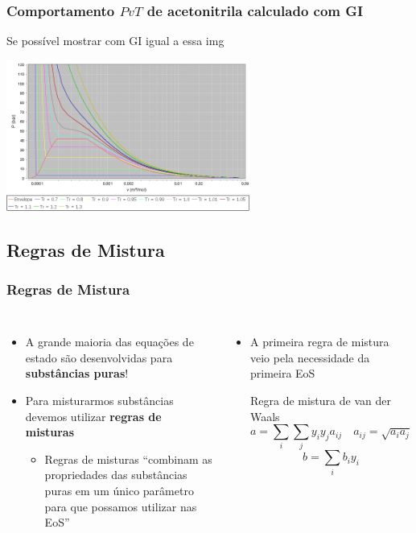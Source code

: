 \documentclass[aspectratio=169]{beamer}
\begin{document}
\begin{frame}
	\frametitle{Comportamento $PvT$ de acetonitrila calculado com GI}
	Se possível mostrar com GI igual a essa img
	\begin{center}
		\includegraphics[width=0.6\textwidth]{img/Acetonitrila.png} 
	\end{center}
\end{frame}

\subsection{Regras de Mistura}

\begin{frame}
	\frametitle{Regras de Mistura}
	\begin{columns}[c]
		\begin{itemize}
			\item A grande maioria das equações de estado são desenvolvidas para
			\textbf{substâncias puras}!
			\item Para misturarmos substâncias devemos utilizar \textbf{regras de
			misturas}
			\begin{itemize}
				\item Regras de misturas ``combinam as propriedades das substâncias puras em
				um único parâmetro para que possamos utilizar nas EoS''	
			\end{itemize}
		\end{itemize}
		\begin{itemize}
			\item A primeira regra de mistura veio pela necessidade da primeira EoS
			\begin{block}{Regra de mistura de van der Waals}
			\begin{equation*}
			a = \sum_i\sum_j{y_iy_ja_{ij}} \quad a_{ij}= \sqrt{a_i a_j}
			\end{equation*}
			\begin{equation*}
			b = \sum_i{b_iy_i}
			\end{equation*}
			\end{block}
		\end{itemize}
	\end{columns}
\end{frame}
\end{document}
